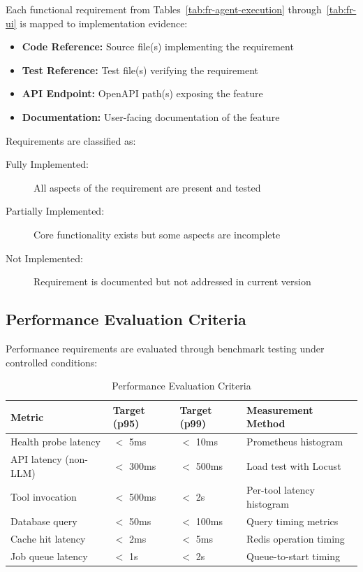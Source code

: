 Each functional requirement from Tables~\ref{tab:fr-agent-execution} through~\ref{tab:fr-ui} is mapped to implementation evidence:

\begin{itemize}
    \item \textbf{Code Reference:} Source file(s) implementing the requirement
    \item \textbf{Test Reference:} Test file(s) verifying the requirement
    \item \textbf{API Endpoint:} OpenAPI path(s) exposing the feature
    \item \textbf{Documentation:} User-facing documentation of the feature
\end{itemize}

Requirements are classified as:
\begin{description}
    \item[Fully Implemented:] All aspects of the requirement are present and tested
    \item[Partially Implemented:] Core functionality exists but some aspects are incomplete
    \item[Not Implemented:] Requirement is documented but not addressed in current version
\end{description}

\subsection{Performance Evaluation Criteria}
\label{subsec:performance-criteria}

Performance requirements are evaluated through benchmark testing under controlled conditions:

\begin{table}[htbp]
\centering
\caption{Performance Evaluation Criteria}
\label{tab:performance-eval}
\small
\begin{tabularx}{\textwidth}{|l|l|l|X|}
\hline
\textbf{Metric} & \textbf{Target (p95)} & \textbf{Target (p99)} & \textbf{Measurement Method} \\
\hline
Health probe latency & $<$ 5ms & $<$ 10ms & Prometheus histogram \\
\hline
API latency (non-LLM) & $<$ 300ms & $<$ 500ms & Load test with Locust \\
\hline
Tool invocation & $<$ 500ms & $<$ 2s & Per-tool latency histogram \\
\hline
Database query & $<$ 50ms & $<$ 100ms & Query timing metrics \\
\hline
Cache hit latency & $<$ 2ms & $<$ 5ms & Redis operation timing \\
\hline
Job queue latency & $<$ 1s & $<$ 2s & Queue-to-start timing \\
\hline
\end{tabularx}
\end{table}


